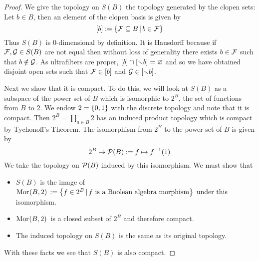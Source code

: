 \begin{proof}
    We give the topology on $S(B)$ the topology generated by the clopen sets:
    Let $b \in B$, 
    then an element of the clopen basis is given by
    \[[b] := \left\{\mathcal{F} \subseteq B \,|\, b \in \mathcal{F}\right\}\]
    Thus $S(B)$ is $0$-dimensional by definition.
    It is Hausdorff because if $\mathcal{F}, \mathcal{G} \in S(B)$ are not equal then 
    without loss of generality there exists $b \in \mathcal{F}$ such that 
    $b \notin \mathcal{G}$. 
    As ultrafilters are proper, $[b] \cap [\smallsetminus b] = \varnothing$ and so
    we have obtained disjoint open sets such that 
    $\mathcal{F} \in [b]$ and $\mathcal{G} \in [\smallsetminus b]$.
    
    Next we show that it is compact. 
    To do this, 
    we will look at $S(B)$ as a subspace of the power set of $B$
    which is isomorphic to
    $2^B$, 
    the set of functions from $B$ to $2$.
    We endow $2 = \left\{0,1\right\}$ with the discrete topology and note that it is 
    compact.
    Then $2^B = \prod_{a \in B} 2$ has an induced product topology which is 
    compact by Tychonoff's Theorem.
    The isomorphism from $2^B$ to the power set of $B$ is given by 
    \[2^B \to \mathcal{P}(B) := f \mapsto f^{-1}(1)\]
    We take the topology on $\mathcal{P}(B)$ induced by this isomorphism.
    We must show that 
    \begin{itemize}
        \item $S(B)$ is the image of 
            $\mathrm{Mor}_{}(B, 2)\, := 
            \left\{f \in 2^B \,|\, f \text{ is a Boolean algebra morphism}\right\}$
            under this isomorphism.
        \item $\mathrm{Mor}_{}(B, 2)\,$ is a closed subset of $2^B$ and therefore
            compact.
        \item The induced topology on $S(B)$ 
            is the same as its original topology.
    \end{itemize}
    With these facts we see that $S(B)$ is also compact.


\end{proof}
